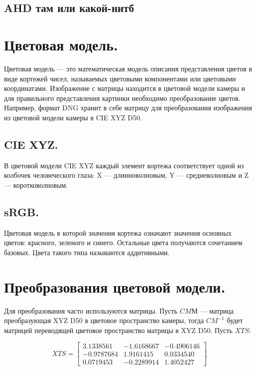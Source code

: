 \subsection{AHD там или какой-нитб}

\section{Цветовая модель.}
Цветовая модель --- это математическая модель описания представления цветов в виде кортежей чисел, называемых цветовыми компонентами или цветовыми координатами. Изображение с матрицы находится в цветовой модели камеры и для правильного представления картинки необходимо преобразование цветов. Например, формат DNG хранит в себе матрицу для преобразования изображения из цветовой модели камеры в CIE XYZ D50.

\subsection{CIE XYZ.}
В цветовой модели CIE XYZ каждый элемент кортежа соответствует одной из колбочек человеческого глаза: X --- длинноволновым, Y --- средневолновым и Z --- коротковолновым.

\subsection{sRGB.}
Цветовая модель в которой значения кортежа означают значения основных цветов: красного, зеленого и синего. Остальные цвета получаются сочетанием базовых. Цвета такого типа называются аддитивными.

\section{Преобразования цветовой модели.}

Для преобразования часто используются матрицы. Пусть $CMМ$ --- матрица преобразующая XYZ D50 в цветовое пространство камеры, тогда $CM^{-1}$ будет матрицей переводящей цветовое пространство матрицы в XYZ D50. Пусть $XTS$:

\begin{equation}
	\label{XTS}
	XTS = \begin{bmatrix}
			3.1338561 & -1.6168667 & -0.4906146\\
			-0.9787684 & 1.9161415 & 0.0334540 \\ 
			0.0719453 & -0.2289914 & 1.4052427
		\end{bmatrix}
\end{equation}

